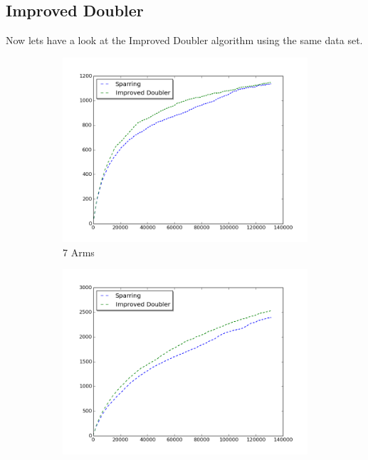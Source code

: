 \documentclass{llncs}
\begin{document}
\newpage
\subsection{Improved Doubler}
Now lets have a look at the Improved Doubler algorithm using the same data set.
\begin{figure}[h!]
\centering
\begin{subfigure}{.5\textwidth}
  \centering
  \includegraphics[scale=0.3, natwidth=410,natheight=442]{figures/improved_doubler_sparring_MQ2007_7arms.png}
  \caption{7 Arms}
  \label{fig:sub1}
\end{subfigure}%
\begin{subfigure}{.5\textwidth}
  \centering
  \includegraphics[scale=0.3, natwidth=410,natheight=442]{figures/improved_doubler_sparring_MQ2007_16arms.png}

\end{subfigure}
\end{figure}
\end{document}
